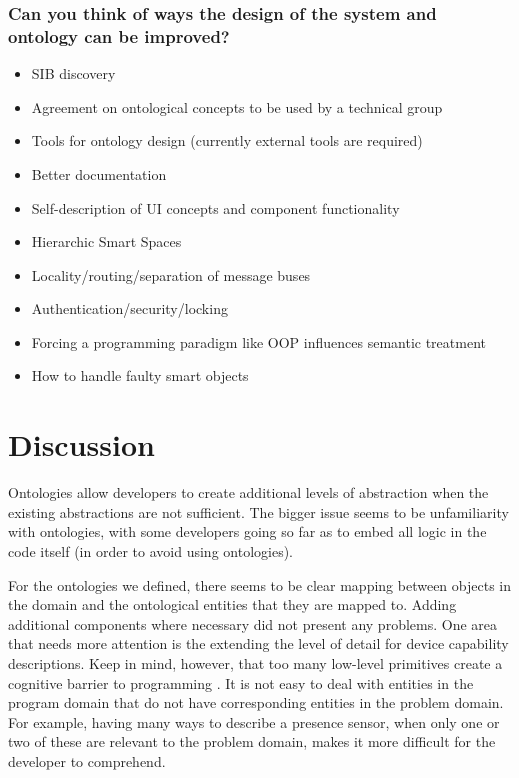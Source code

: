 \subsubsection{Can you think of ways the design of the system and ontology can be improved?}
\begin{itemize}

	\item SIB discovery
	\item Agreement on ontological concepts to be used by a technical group
	\item Tools for ontology design (currently external tools are required)
	\item Better documentation
	\item Self-description of UI concepts and component functionality 
	\item Hierarchic Smart Spaces
	\item Locality/routing/separation of message buses
	\item Authentication/security/locking
	\item Forcing a programming paradigm like OOP influences semantic treatment
	\item How to handle faulty smart objects
\end{itemize}


\section{Discussion}

Ontologies allow developers to create additional levels of abstraction when the existing abstractions are not sufficient. The bigger issue seems to be unfamiliarity with ontologies, with some developers going so far as to embed all logic in the code itself (in order to avoid using ontologies).

For the ontologies we defined, there seems to be clear mapping between objects in the domain and the ontological entities that they are mapped to. Adding additional components where necessary did not present any problems. One area that needs more attention is the extending the level of detail for device capability descriptions. Keep in mind, however, that too many low-level primitives create a cognitive barrier to programming \cite{Green1996}. It is not easy to deal with entities in the program domain that do not have corresponding entities in the problem domain. For example, having many ways to describe a presence sensor, when only one or two of these are relevant to the problem domain, makes it more difficult for the developer to comprehend.

